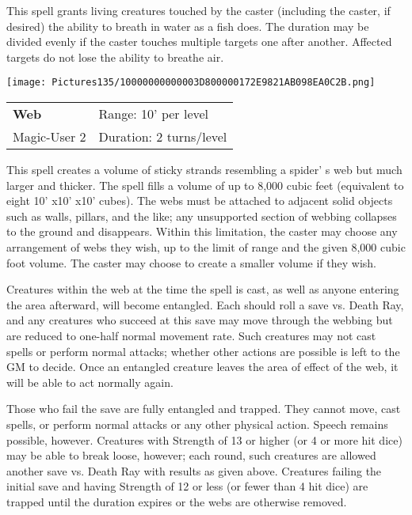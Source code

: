 \documentclass[a4paper,twoside,openany,10pt]{book}
\begin{document}
\begin{multicols}{2}
This spell grants living creatures touched by the caster (including the caster, if desired) the ability to breath in water as a fish does. The duration may be divided evenly if the caster touches multiple targets one after another. Affected targets do not lose the ability to breathe air.

\medskip

\begin{flushleft}
\texttt{[image: Pictures135/10000000000003D800000172E9821AB098EA0C2B.png]}
\end{flushleft}

\smallskip\begin{flushleft} 
	\begin{tabularx}{0.45\textwidth}{@{}m{3.5cm}m{5.5cm}@{}} 
		\textbf{Web} & Range: 10' per level\\
		Magic-User 2 &Duration: 2 turns/level\\
	\end{tabularx}\end{flushleft}

This spell creates a volume of sticky strands resembling a spider' s web but much larger and thicker. The spell fills a volume of up to 8,000 cubic feet (equivalent to eight 10' x10' x10' cubes). The webs must be attached to adjacent solid objects such as walls, pillars, and the like; any unsupported section of webbing collapses to the ground and disappears. Within this limitation, the caster may choose any arrangement of webs they wish, up to the limit of range and the given 8,000 cubic foot volume. The caster may choose to create a smaller volume if they wish.

Creatures within the web at the time the spell is cast, as well as anyone entering the area afterward, will become entangled. Each should roll a save vs. Death Ray, and any creatures who succeed at this save may move through the webbing but are reduced to one-half normal movement rate. Such creatures may not cast spells or perform normal attacks; whether other actions are possible is left to the GM to decide. Once an entangled creature leaves the area of effect of the web, it will be able to act normally again.

Those who fail the save are fully entangled and trapped. They cannot move, cast spells, or perform normal attacks or any other physical action. Speech remains possible, however. Creatures with Strength of 13 or higher (or 4 or more hit dice) may be able to break loose, however; each round, such creatures are allowed another save vs. Death Ray with results as given above. Creatures failing the initial save and having Strength of 12 or less (or fewer than 4 hit dice) are trapped until the duration expires or the webs are otherwise removed.


\end{multicols}
\end{document}
